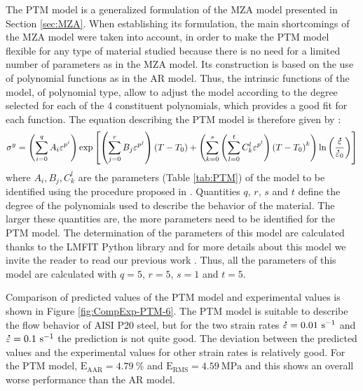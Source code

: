 \documentclass[twoside,english,1p,final,sort&compress]{elsarticle}
\theoremstyle{plain}
\DeclareRobustCommand{\mdot}[1]{\accentset{\mbox{\bfseries .}}{#1}}
\DeclareRobustCommand{\RMSE}{\text{E}_\text{RMS}}
\DeclareRobustCommand{\AARE}{\text{E}_\text{AAR}}
\DeclareRobustCommand{\ps}{\text{s}^{-1}}
\begin{document}
The PTM model \cite{TizeMha-2022} is a generalized formulation of the MZA model presented in Section \ref{sec:MZA}.
When establishing its formulation, the main shortcomings of the MZA model were taken into account, in order to make the PTM model flexible for any type of material studied because there is no need for a limited number of parameters as in the MZA model.
Its construction is based on the use of polynomial functions as in the AR model.
Thus, the intrinsic functions of the model, of polynomial type, allow to adjust the model according to the degree selected for each of the 4 constituent polynomials, which provides a good fit for each function.
The equation describing the PTM model is therefore given by :
\begin{equation}
\label{eq:PTM-model}
\sigma^y = \left(\sum_{i=0}^{q}{A_i\varepsilon^{p^i}}\right) \exp\left[\left(\sum_{j=0}^{r}{B_j\varepsilon^{p^j}}\right)\left(T-T_0\right) + \left(\sum_{k=0}^{s}\left(\sum_{l=0}^{t}{C_k^l\varepsilon^{p^l}} \right)\left(T-T_0\right)^k \right)\ln\left( \frac{\mdot\varepsilon}{\mdot{\varepsilon}_0}\right)\right]
\end{equation}
where $A_i, B_j, C_k^l$ are the parameters (Table \ref{tab:PTM}) of the model to be identified using the procedure proposed in  \cite{TizeMha-2022}.
Quantities $q$, $r$, $s$ and $t$ define the degree of the polynomials used to describe the behavior of the material.
The larger these quantities are, the more parameters need to be identified for the PTM model.
The determination of the parameters of this model are calculated thanks to the LMFIT Python library \cite{Newville-2016} and for more details about this model  we invite the reader to read our previous work \cite{TizeMha-2022}.
Thus, all the parameters of this model are calculated with $q=5$, $r=5$, $s=1$ and $t=5$.

Comparison of predicted values of the PTM model and experimental values is shown in Figure \ref{fig:CompExp-PTM-6}.
The PTM model is suitable to describe the ﬂow behavior of AISI P20 steel, but for the two strain rates $\mdot\varepsilon=0.01~\ps$ and $\mdot\varepsilon=0.1~\ps$ the prediction is not quite good.
The deviation between the predicted values and the experimental values for other strain rates is relatively good.
For the PTM model, $\AARE=4.79~\%$ and $\RMSE=4.59~\text{MPa}$ and this shows an overall worse performance than the AR model.
\end{document}
